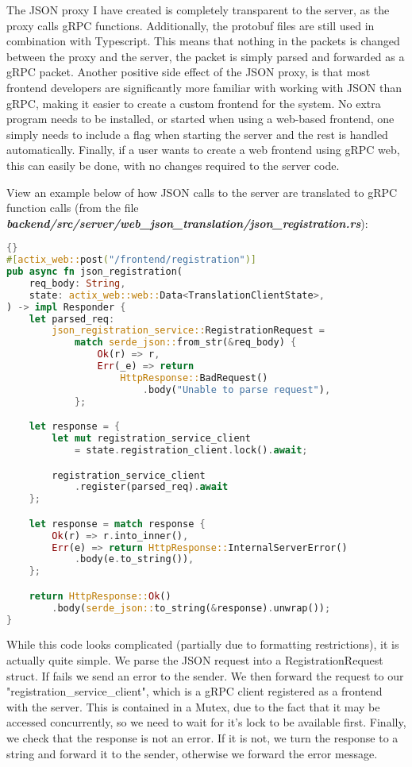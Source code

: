 The JSON proxy I have created is completely transparent to the server, as the proxy calls gRPC functions. Additionally, the protobuf files are still used in combination with Typescript. This means that nothing in the packets is changed between the proxy and the server, the packet is simply parsed and forwarded as a gRPC packet. Another positive side effect of the JSON proxy, is that most frontend developers are significantly more familiar with working with JSON than gRPC, making it easier to create a custom frontend for the system. No extra program needs to be installed, or started when using a web-based frontend, one simply needs to include a flag when starting the server and the rest is handled automatically. Finally, if a user wants to create a web frontend using gRPC web, this can easily be done, with no changes required to the server code.

View an example below of how JSON calls to the server are translated to gRPC function calls (from the file \textit{\textbf{backend/src/server/web\_json\_translation/json\_registration.rs}}): 
\begin{lstlisting}[language=Rust, style=boxed, showstringspaces=false]{}
#[actix_web::post("/frontend/registration")]
pub async fn json_registration(
    req_body: String,
    state: actix_web::web::Data<TranslationClientState>,
) -> impl Responder {
    let parsed_req: 
        json_registration_service::RegistrationRequest =
            match serde_json::from_str(&req_body) {
                Ok(r) => r,
                Err(_e) => return 
                    HttpResponse::BadRequest()
                        .body("Unable to parse request"),
            };

    let response = {
        let mut registration_service_client 
            = state.registration_client.lock().await;

        registration_service_client
            .register(parsed_req).await
    };

    let response = match response {
        Ok(r) => r.into_inner(),
        Err(e) => return HttpResponse::InternalServerError()
            .body(e.to_string()),
    };

    return HttpResponse::Ok()
        .body(serde_json::to_string(&response).unwrap());
}
\end{lstlisting}
While this code looks complicated (partially due to formatting restrictions), it is actually quite simple. We parse the JSON request into a RegistrationRequest struct. If fails we send an error to the sender. We then forward the request to our "registration\_service\_client", which is a gRPC client registered as a frontend with the server. This is contained in a Mutex, due to the fact that it may be accessed concurrently, so we need to wait for it's lock to be available first. Finally, we check that the response is not an error. If it is not, we turn the response to a string and forward it to the sender, otherwise we forward the error message.

